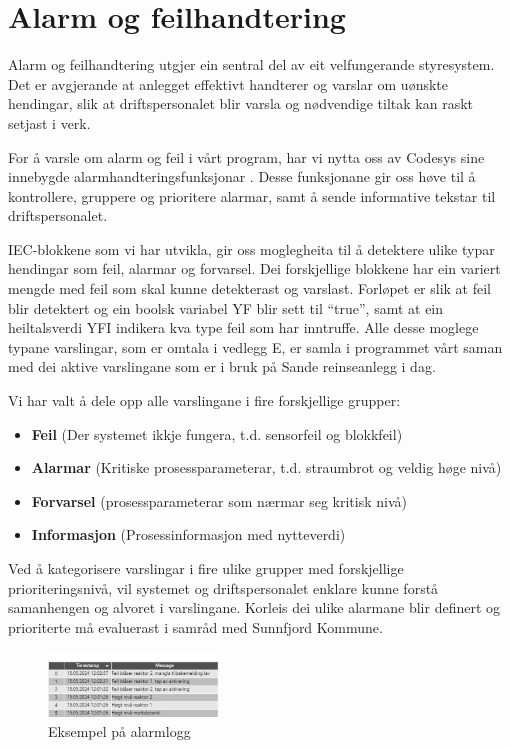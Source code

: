 \newpage
\section{Alarm og feilhandtering}
\thispagestyle{fancy}

Alarm og feilhandtering utgjer ein sentral del av eit velfungerande styresystem. Det er avgjerande
at anlegget effektivt handterer og varslar om uønskte hendingar, slik at 
driftspersonalet blir varsla og nødvendige tiltak kan raskt setjast i verk.

For å varsle om alarm og feil i vårt program, har vi nytta oss av \gls{Codesys} sine
innebygde alarmhandteringsfunksjonar \citep{CodesysAlarm}. Desse funksjonane gir oss høve til å 
kontrollere, gruppere og prioritere alarmar, samt å sende informative tekstar til driftspersonalet.

\gls{IEC}-blokkene som vi har utvikla, gir oss moglegheita til å detektere ulike typar hendingar
som feil, alarmar og forvarsel.
Dei forskjellige blokkene har ein variert mengde med feil som skal kunne detekterast og varslast.
Forløpet er slik at feil blir detektert og ein boolsk variabel \gls{YF} blir sett til ``true'', 
samt at ein heiltalsverdi \gls{YFI} indikera kva type feil som har inntruffe.\newline
Alle desse moglege typane varslingar, som er omtala i vedlegg E, 
er samla i programmet vårt saman 
med dei aktive varslingane som er i bruk på Sande reinseanlegg i dag.

Vi har valt å dele opp alle varslingane i fire forskjellige grupper:

\begin{itemize}
    \item \textbf{Feil}          (Der systemet ikkje fungera, t.d. sensorfeil og blokkfeil)
    \item \textbf{Alarmar}       (Kritiske prosessparameterar, t.d. straumbrot og veldig høge nivå)
    \item \textbf{Forvarsel}     (prosessparameterar som nærmar seg kritisk nivå)
    \item \textbf{Informasjon}   (Prosessinformasjon med nytteverdi)
\end{itemize}

Ved å kategorisere varslingar i fire ulike grupper med forskjellige prioriteringsnivå,
vil systemet og driftspersonalet enklare kunne forstå samanhengen og alvoret i varslingane. \newline
Korleis dei ulike alarmane blir definert og prioriterte må evaluerast i samråd med \gls{Sunnfjord Kommune}.




\begin{figure}[htbp]
    \centering
    \includegraphics[width=0.4\textwidth]{Bilder/Alarmeksempel.png}
    \caption{Eksempel på alarmlogg}\label{fig:Alarmlogg}
\end{figure}

\newpage

